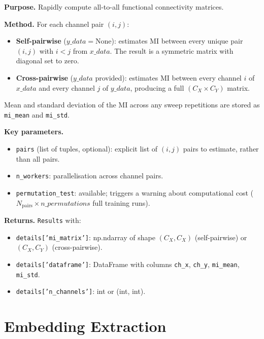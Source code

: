 \documentclass[12pt]{article}
\newcommand{\api}[1]{\texttt{#1}}
\begin{document}
\textbf{Purpose.}  Rapidly compute all-to-all functional connectivity
matrices.

\textbf{Method.}  For each channel pair $(i,j)$:
\begin{itemize}[leftmargin=*]
  \item \textbf{Self-pairwise} ($y\_data=\text{None}$): estimates MI
        between every unique pair $(i,j)$ with $i<j$ from $x\_data$.
        The result is a symmetric matrix with diagonal set to zero.
  \item \textbf{Cross-pairwise} ($y\_data$ provided): estimates MI between
        every channel $i$ of $x\_data$ and every channel $j$ of $y\_data$,
        producing a full $(C_X \times C_Y)$ matrix.
\end{itemize}

Mean and standard deviation of the MI across any sweep repetitions are
stored as \api{mi\_mean} and \api{mi\_std}.

\textbf{Key parameters.}
\begin{itemize}[leftmargin=*]
  \item \api{pairs} (list of tuples, optional): explicit list of
        $(i,j)$ pairs to estimate, rather than all pairs.
  \item \api{n\_workers}: parallelisation across channel pairs.
  \item \api{permutation\_test}: available; triggers a warning about
        computational cost ($N_{\mathrm{pairs}} \times n\_permutations$ full
        training runs).
\end{itemize}

\textbf{Returns.}  \api{Results} with:
\begin{itemize}[leftmargin=*]
  \item \api{details['mi\_matrix']}: np.ndarray of shape
        $(C_X,C_X)$ (self-pairwise) or $(C_X,C_Y)$ (cross-pairwise).
  \item \api{details['dataframe']}: DataFrame with columns \api{ch\_x},
        \api{ch\_y}, \api{mi\_mean}, \api{mi\_std}.
  \item \api{details['n\_channels']}: int or (int, int).
\end{itemize}

\section{Embedding Extraction}
\label{sec:embeddings}
\end{document}
